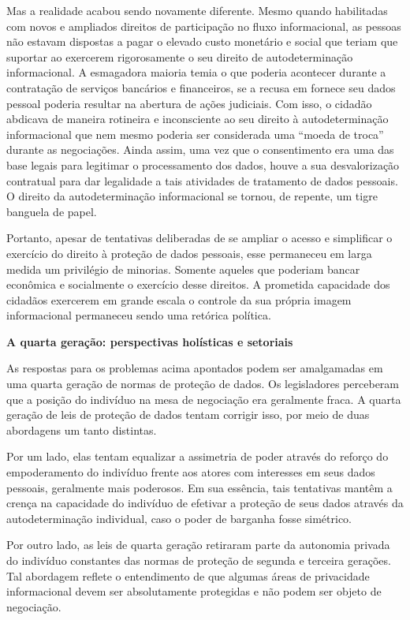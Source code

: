 Mas a realidade acabou sendo novamente diferente. Mesmo quando
habilitadas com novos e ampliados direitos de participação no fluxo
informacional, as pessoas não estavam dispostas a pagar o elevado custo
monetário e social que teriam que suportar ao exercerem rigorosamente o
seu direito de autodeterminação informacional. A esmagadora maioria
temia o que poderia acontecer durante a contratação de serviços
bancários e financeiros, se a recusa em fornece seu dados pessoal
poderia resultar na abertura de ações judiciais. Com isso, o cidadão
abdicava de maneira rotineira e inconsciente ao seu direito à
autodeterminação informacional que nem mesmo poderia ser considerada uma
``moeda de troca'' durante as negociações. Ainda assim, uma vez que o
consentimento era uma das base legais para legitimar o processamento dos
dados, houve a sua desvalorização contratual para dar legalidade a tais
atividades de tratamento de dados pessoais. O direito da
autodeterminação informacional se tornou, de repente, um tigre banguela
de papel.

Portanto, apesar de tentativas deliberadas de se ampliar o acesso e
simplificar o exercício do direito à proteção de dados pessoais, esse
permaneceu em larga medida um privilégio de minorias. Somente aqueles
que poderiam bancar econômica e socialmente o exercício desse direitos.
A prometida capacidade dos cidadãos exercerem em grande escala o
controle da sua própria imagem informacional permaneceu sendo uma
retórica política.

\textbf{A quarta geração: perspectivas holísticas e setoriais}

As respostas para os problemas acima apontados podem ser amalgamadas em
uma quarta geração de normas de proteção de dados. Os legisladores
perceberam que a posição do indivíduo na mesa de negociação era
geralmente fraca. A quarta geração de leis de proteção de dados tentam
corrigir isso, por meio de duas abordagens um tanto distintas.

Por um lado, elas tentam equalizar a assimetria de poder através do
reforço do empoderamento do indivíduo frente aos atores com interesses
em seus dados pessoais, geralmente mais poderosos. Em sua essência, tais
tentativas mantêm a crença na capacidade do indivíduo de efetivar a
proteção de seus dados através da autodeterminação individual, caso o
poder de barganha fosse simétrico.

Por outro lado, as leis de quarta geração retiraram parte da autonomia
privada do indivíduo constantes das normas de proteção de segunda e
terceira gerações. Tal abordagem reflete o entendimento de que algumas
áreas de privacidade informacional devem ser absolutamente protegidas e
não podem ser objeto de negociação.

